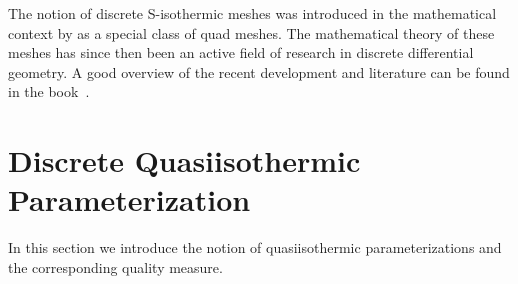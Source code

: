 \documentclass[twoside]{article}
\begin{document}
The notion of discrete S-isothermic meshes was introduced in the mathematical
context by \cite{BobPin:DiscSurfIntSys:1996} as a special class of quad meshes.
The mathematical theory of these meshes has since then been an active field of
research in discrete differential geometry. A good overview of the recent
development and literature can be found in the book~\cite{ddg-book}. 


\section{Discrete Quasiisothermic Parameterization}
\label{sec:parametrization}

In this section we introduce the notion of quasiisothermic parameterizations and the
corresponding quality measure.
\end{document}

